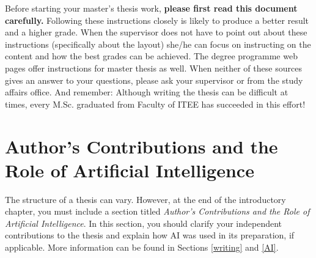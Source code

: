 Before starting your master’s thesis work, \textbf{please first read this document carefully.} Following these instructions closely is likely to produce a better result and a higher grade. When the supervisor does not have to point out about these instructions (specifically about the layout) she/he can focus on instructing on the content and how the best grades can be achieved. The degree programme web pages \cite{mscstudies} offer instructions for master thesis as well. When neither of these sources gives an answer to your questions, please ask your supervisor or from the study affairs office. And remember: Although writing the thesis can be difficult at times, every M.Sc. graduated from Faculty of ITEE has succeeded in this effort!

\section{Author's Contributions and the Role of Artificial Intelligence}

The structure of a thesis can vary. However, at the end of the introductory chapter, you must include a section titled \textit{Author's Contributions and the Role of Artificial Intelligence}. In this section, you should clarify your independent contributions to the thesis and explain how AI was used in its preparation, if applicable. More information can be found in Sections \ref{writing} and \ref{AI}.

